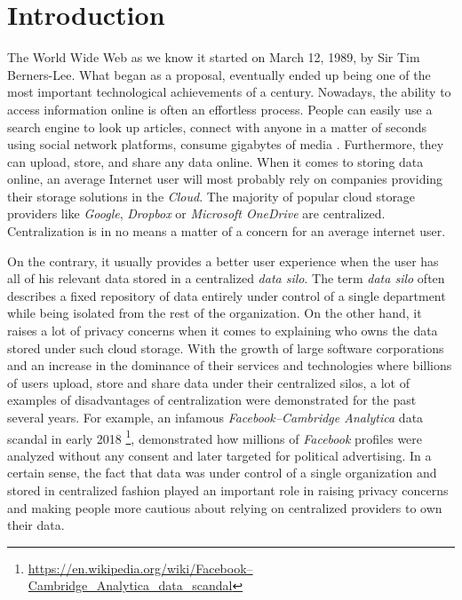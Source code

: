 \chapter*{Introduction}
\label{chap:introduction}

The World Wide Web as we know it started on March 12, 1989, by Sir Tim Berners-Lee. What began as a proposal, eventually ended up being one of the most important technological achievements of a century. Nowadays, the ability to access information online is often an effortless process. People can easily use a search engine to look up articles, connect with anyone in a matter of seconds using social network platforms, consume gigabytes of media \cite{www_foundation_intro}. Furthermore, they can upload, store, and share any data online. When it comes to storing data online, an average Internet user will most probably rely on companies providing their storage solutions in the \textit{Cloud}. The majority of popular cloud storage providers like \textit{Google}, \textit{Dropbox} or \textit{Microsoft OneDrive} are centralized. Centralization is in no means a matter of a concern for an average internet user.

On the contrary, it usually provides a better user experience when the user has all of his relevant data stored in a centralized \textit{data silo}. The term \textit{data silo} often describes a fixed repository of data entirely under control of a single department while being isolated from the rest of the organization. On the other hand, it raises a lot of privacy concerns when it comes to explaining who owns the data stored under such cloud storage. With the growth of large software corporations and an increase in the dominance of their services and technologies where billions of users upload, store and share data under their centralized silos, a lot of examples of disadvantages of centralization were demonstrated for the past several years. For example, an infamous \textit{Facebook–Cambridge Analytica} data scandal in early 2018 \footnote{\url{https://en.wikipedia.org/wiki/Facebook–Cambridge_Analytica_data_scandal}}, demonstrated how millions of \textit{Facebook} profiles were analyzed without any consent and later targeted for political advertising. In a certain sense, the fact that data was under control of a single organization and stored in centralized fashion played an important role in raising privacy concerns and making people more cautious about relying on centralized providers to own their data.

